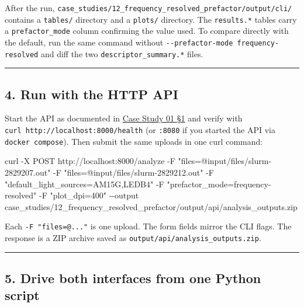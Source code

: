\documentclass[
  11pt,
]{article}
\newenvironment{Shaded}{}{}
\newcommand{\AttributeTok}[1]{\textcolor[rgb]{0.49,0.56,0.16}{#1}}
\newcommand{\ExtensionTok}[1]{#1}
\newcommand{\NormalTok}[1]{#1}
\newcommand{\StringTok}[1]{\textcolor[rgb]{0.25,0.44,0.63}{#1}}
\begin{document}
After the run,
\texttt{case\_studies/12\_frequency\_resolved\_prefactor/output/cli/}
contains a \texttt{tables/} directory and a \texttt{plots/} directory.
The \texttt{results.*} tables carry a \texttt{prefactor\_mode} column
confirming the value used. To compare directly with the default, run the
same command without \texttt{-{}-prefactor-mode frequency-resolved} and
diff the two \texttt{descriptor\_summary.*} files.

\begin{center}\rule{0.5\linewidth}{0.5pt}\end{center}

\hypertarget{4-run-with-the-http-api}{
\subsection{4. Run with the HTTP API}\label{4-run-with-the-http-api}}

Start the API as documented in
\href{https://github.com/pinarsyt/overlap-calculator/blob/main/case_studies/01_theoretical_only/README.md\#1-prerequisites}{Case
Study 01 \S1} and verify with
\texttt{curl\ http://localhost:8000/health} (or \texttt{:8080} if you
started the API via \texttt{docker compose}). Then submit the same
uploads in one curl command:

\begin{Shaded}
\begin{Highlighting}[]
\ExtensionTok{curl} \AttributeTok{{-}X}\NormalTok{ POST http://localhost:8000/analyze }\AttributeTok{{-}F} \StringTok{"files=@input/files/slurm-2829207.out"} \AttributeTok{{-}F} \StringTok{"files=@input/files/slurm-2829212.out"} \AttributeTok{{-}F} \StringTok{"default\_light\_sources=AM15G,LEDB4"} \AttributeTok{{-}F} \StringTok{"prefactor\_mode=frequency-resolved"} \AttributeTok{{-}F} \StringTok{"plot\_dpi=400"} \AttributeTok{{-}{-}output}\NormalTok{ case\_studies/12\_frequency\_resolved\_prefactor/output/api/analysis\_outputs.zip}
\end{Highlighting}
\end{Shaded}

Each \texttt{-F\ "files=@..."} is one upload. The form fields mirror the
CLI flags. The response is a ZIP archive saved as
\texttt{output/api/analysis\_outputs.zip}.

\begin{center}\rule{0.5\linewidth}{0.5pt}\end{center}

\hypertarget{5-drive-both-interfaces-from-one-python-script}{
\subsection{5. Drive both interfaces from one Python
script}\label{5-drive-both-interfaces-from-one-python-script}}
\end{document}
